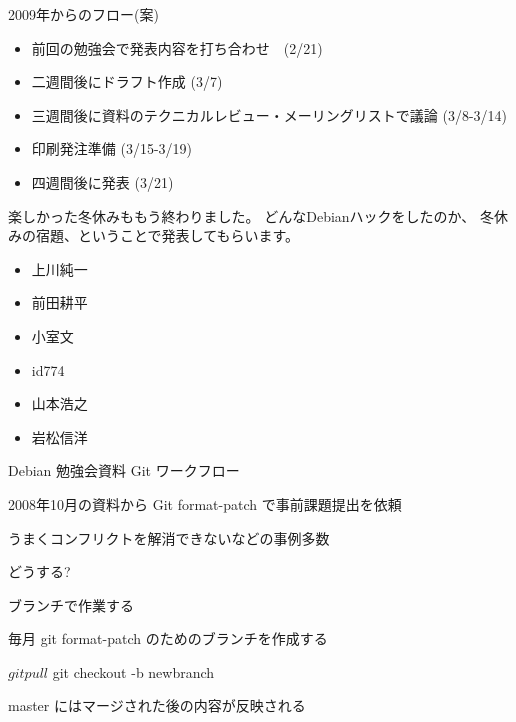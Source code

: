 \begin{frame}{2009年からのフロー(案)}

\begin{itemize}
 \item 前回の勉強会で発表内容を打ち合わせ　(2/21)
 \item 二週間後にドラフト作成 (3/7)
 \item 三週間後に資料のテクニカルレビュー・メーリングリストで議論 (3/8-3/14)
 \item 印刷発注準備 (3/15-3/19)
 \item 四週間後に発表 (3/21)
\end{itemize}

\end{frame}


\begin{frame}{}

楽しかった冬休みももう終わりました。
どんなDebianハックをしたのか、
冬休みの宿題、ということで発表してもらいます。

\begin{itemize}
 \item 上川純一
 \item 前田耕平
 \item 小室文
 \item id774
 \item 山本浩之
 \item 岩松信洋
\end{itemize}

\end{frame}


\begin{frame}{Debian 勉強会資料 Git ワークフロー}

2008年10月の資料から Git format-patch で事前課題提出を依頼

うまくコンフリクトを解消できないなどの事例多数

どうする?

\end{frame}

\begin{frame}[containsverbatim]{ブランチで作業する}

毎月 git format-patch のためのブランチを作成する

\begin{commandline}
$ git pull
$ git checkout -b newbranch
\end{commandline}

master にはマージされた後の内容が反映される
\end{frame}

